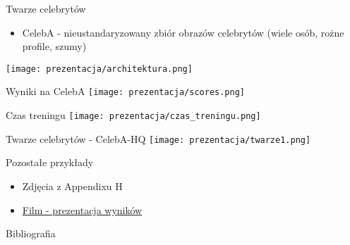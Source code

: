 \documentclass[11pt]{beamer}
\newcommand{\backupbegin}{
   \newcounter{finalframe}
   \setcounter{finalframe}{\value{framenumber}}
}
\newcommand{\backupend}{
   \setcounter{framenumber}{\value{finalframe}}
}
\begin{document}
\begin{frame}{Twarze celebrytów}
\begin{itemize}
    \item CelebA - nieustandaryzowany zbiór obrazów celebrytów (wiele osób, rożne profile, szumy)
\end{itemize}
\minipage{\textwidth}
\texttt{[image: prezentacja/architektura.png]}
\endminipage
\end{frame}

\begin{frame}{Wyniki na CelebA}
\minipage{\textwidth}
\texttt{[image: prezentacja/scores.png]}
\endminipage
\end{frame}

\begin{frame}{Czas treningu}
\minipage{\textwidth}
\texttt{[image: prezentacja/czas\_treningu.png]}
\endminipage
\end{frame}

\begin{frame}{Twarze celebrytów - CelebA-HQ}
\minipage{\textwidth}
\texttt{[image: prezentacja/twarze1.png]}
\endminipage
\end{frame}

\begin{frame}{Pozostałe przykłady}
\begin{itemize}
    \item Zdjęcia z Appendixu H
    \item \href{https://www.youtube.com/watch?v=G06dEcZ-QTg}{Film - prezentacja wyników}
\end{itemize}    
\end{frame}
    
\begin{frame}{Bibliografia} 

\nocite{*}


\end{frame}

\appendix
\backupbegin

\backupend
\end{document}
